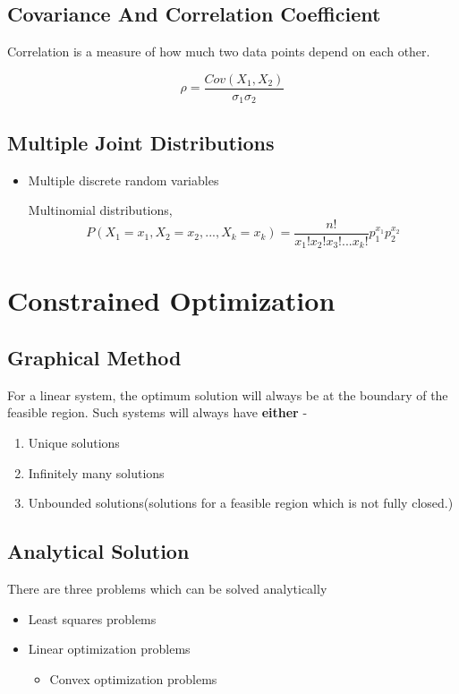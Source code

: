 \documentclass[11pt]{report}
\begin{document}
\section{Covariance And Correlation Coefficient}
\label{sec:org88ede2a}

Correlation is a measure of how much two data points depend on each other.

$$\rho = \frac{Cov(X_1,X_2)}{\sigma_1 \sigma_2}$$
\section{Multiple Joint Distributions}
\label{sec:org5dc5f51}

\begin{itemize}
\item Multiple discrete random variables

Multinomial distributions, $$P(X_1 = x_{1}, X_2 = x_2, ... , X_k = x_k) = \frac{n!}{x_1! x_2! x_3! ... x_k!} p_1^{x_1}p_2^{x_2}$$
\end{itemize}
\chapter{Constrained Optimization}
\label{sec:orga2d440b}
\section{Graphical Method}
\label{sec:orgdfb0979}
For a linear system, the optimum solution will always be at the boundary of the feasible region. Such systems will always have \textbf{either} -
\begin{enumerate}
\item Unique solutions
\item Infinitely many solutions
\item Unbounded solutions(solutions for a feasible region which is not fully closed.)
\end{enumerate}
\section{Analytical Solution}
\label{sec:org9442d64}
There are three problems which can be solved analytically
\begin{itemize}
\item Least squares problems
\item Linear optimization problems
\begin{itemize}
\item Convex optimization problems
\end{itemize}
\end{itemize}
\end{document}
